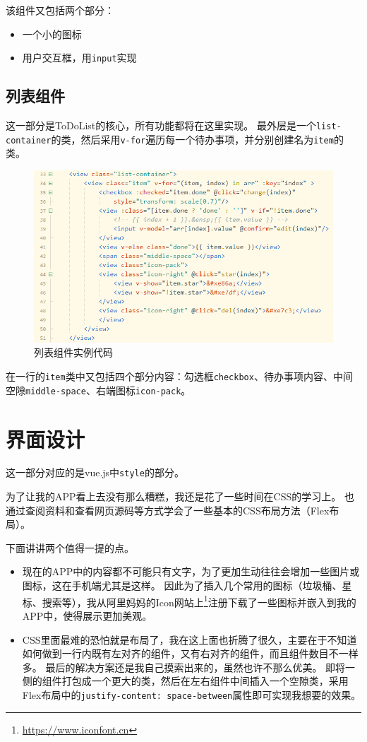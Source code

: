 \documentclass[logo,reportComp]{thesis}
\begin{document}
该组件又包括两个部分：
\begin{itemize}
	\item 一个小的图标
	\item 用户交互框，用\verb'input'实现
\end{itemize}

\subsection{列表组件}
这一部分是ToDoList的核心，所有功能都将在这里实现。
最外层是一个\verb'list-container'的类，然后采用\verb'v-for'遍历每一个待办事项，并分别创建名为\verb'item'的类。
\begin{figure}[H]
\centering
\includegraphics[width=0.8\linewidth]{fig/list_container.png}
\caption{列表组件实例代码}
\label{fig:list}
\end{figure}

在一行的\verb'item'类中又包括四个部分内容：勾选框\verb'checkbox'、待办事项内容、中间空隙\verb'middle-space'、右端图标\verb'icon-pack'。

\section{界面设计}
这一部分对应的是vue.js中\verb'style'的部分。

为了让我的APP看上去没有那么糟糕，我还是花了一些时间在CSS的学习上。
也通过查阅资料和查看网页源码等方式学会了一些基本的CSS布局方法（Flex布局）。

下面讲讲两个值得一提的点。
\begin{itemize}
	\item 现在的APP中的内容都不可能只有文字，为了更加生动往往会增加一些图片或图标，这在手机端尤其是这样。
	因此为了插入几个常用的图标（垃圾桶、星标、搜索等），我从阿里妈妈的Icon网站上\footnote{\url{https://www.iconfont.cn}}注册下载了一些图标并嵌入到我的APP中，使得展示更加美观。
	\item CSS里面最难的恐怕就是布局了，我在这上面也折腾了很久，主要在于不知道如何做到一行内既有左对齐的组件，又有右对齐的组件，而且组件数目不一样多。
	最后的解决方案还是我自己摸索出来的，虽然也许不那么优美。
	即将一侧的组件打包成一个更大的类，然后在左右组件中间插入一个空隙类，采用Flex布局中的\verb'justify-content: space-between'属性即可实现我想要的效果。
\end{itemize}
\end{document}
